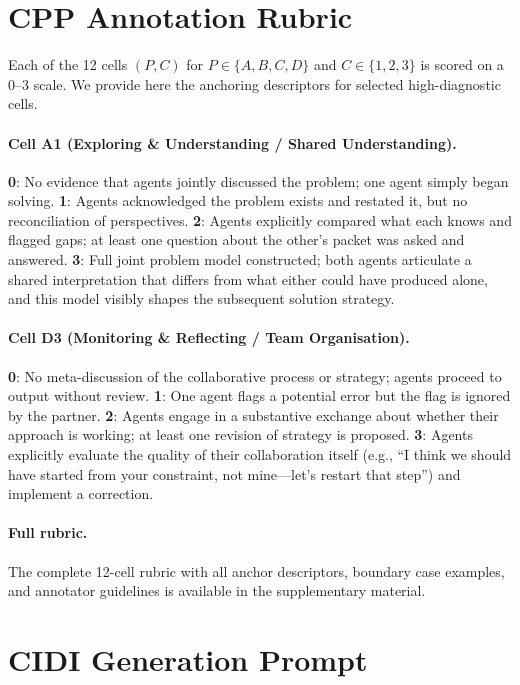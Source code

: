 \documentclass{article}
\begin{document}
\section{CPP Annotation Rubric}
\label{app:rubric}

Each of the 12 cells $(P, C)$ for $P \in \{A, B, C, D\}$ and
$C \in \{1, 2, 3\}$ is scored on a 0--3 scale. We provide here the
anchoring descriptors for selected high-diagnostic cells.

\paragraph{Cell A1 (Exploring \& Understanding / Shared Understanding).}
\textbf{0}: No evidence that agents jointly discussed the problem;
one agent simply began solving. \textbf{1}: Agents acknowledged the
problem exists and restated it, but no reconciliation of perspectives.
\textbf{2}: Agents explicitly compared what each knows and flagged
gaps; at least one question about the other's packet was asked and
answered. \textbf{3}: Full joint problem model constructed; both
agents articulate a shared interpretation that differs from what
either could have produced alone, and this model visibly shapes the
subsequent solution strategy.

\paragraph{Cell D3 (Monitoring \& Reflecting / Team Organisation).}
\textbf{0}: No meta-discussion of the collaborative process or
strategy; agents proceed to output without review. \textbf{1}: One
agent flags a potential error but the flag is ignored by the partner.
\textbf{2}: Agents engage in a substantive exchange about whether
their approach is working; at least one revision of strategy is
proposed. \textbf{3}: Agents explicitly evaluate the quality of their
collaboration itself (e.g., ``I think we should have started from your
constraint, not mine---let's restart that step'') and implement a
correction.

\paragraph{Full rubric.} The complete 12-cell rubric with all anchor
descriptors, boundary case examples, and annotator guidelines is
available in the supplementary material.

\section{CIDI Generation Prompt}
\label{app:cidi_prompt}
\end{document}
